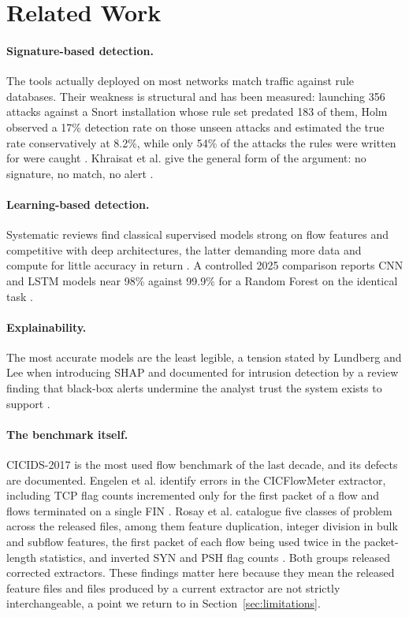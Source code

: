 \documentclass[runningheads]{llncs}
\begin{document}
\section{Related Work}

\paragraph{Signature-based detection.}
The tools actually deployed on most networks match traffic against rule databases. Their weakness is structural and has been measured: launching 356 attacks against a Snort installation whose rule set predated 183 of them, Holm observed a 17\% detection rate on those unseen attacks and estimated the true rate conservatively at 8.2\%, while only 54\% of the attacks the rules were written for were caught \cite{holm2014signature}. Khraisat et al. give the general form of the argument: no signature, no match, no alert \cite{khraisat2019survey}.

\paragraph{Learning-based detection.}
Systematic reviews find classical supervised models strong on flow features and competitive with deep architectures, the latter demanding more data and compute for little accuracy in return \cite{ahmad2021network,kimanzi2024deep}. A controlled 2025 comparison reports CNN and LSTM models near 98\% against 99.9\% for a Random Forest on the identical task \cite{ali2025dlvsml}.

\paragraph{Explainability.}
The most accurate models are the least legible, a tension stated by Lundberg and Lee when introducing SHAP \cite{lundberg2017shap} and documented for intrusion detection by a review finding that black-box alerts undermine the analyst trust the system exists to support \cite{mohale2025xaiids}.

\paragraph{The benchmark itself.}
CICIDS-2017 \cite{sharafaldin2018cicids} is the most used flow benchmark of the last decade, and its defects are documented. Engelen et al. identify errors in the CICFlowMeter extractor, including TCP flag counts incremented only for the first packet of a flow and flows terminated on a single FIN \cite{engelen2021troubleshooting}. Rosay et al. catalogue five classes of problem across the released files, among them feature duplication, integer division in bulk and subflow features, the first packet of each flow being used twice in the packet-length statistics, and inverted SYN and PSH flag counts \cite{rosay2022comprehensive}. Both groups released corrected extractors. These findings matter here because they mean the released feature files and files produced by a current extractor are not strictly interchangeable, a point we return to in Section~\ref{sec:limitations}.
\end{document}
